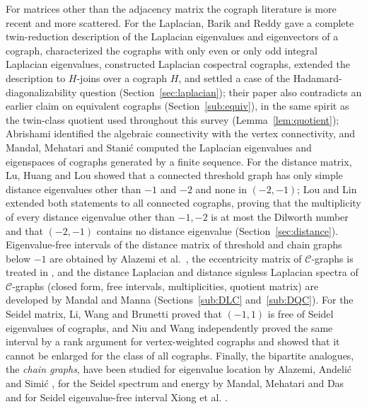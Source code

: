\documentclass[11pt]{article}
\theoremstyle{plain}
\theoremstyle{definition}
\theoremstyle{remark}
\begin{document}
	For matrices other than the adjacency matrix the cograph literature is more recent and more scattered. For the Laplacian, Barik and Reddy \cite{BarikReddy2023} gave a complete twin-reduction description of the Laplacian eigenvalues and eigenvectors of a cograph, characterized the cographs with only even or only odd integral Laplacian eigenvalues, constructed Laplacian cospectral cographs, extended the description to $H$-joins over a cograph $H$, and settled a case of the Hadamard-diagonalizability question (Section~\ref{sec:laplacian}); their paper also contradicts an earlier claim on equivalent cographs (Section~\ref{sub:equiv}), in the same spirit as the twin-class quotient used throughout this survey (Lemma~\ref{lem:quotient}); Abrishami \cite{Abrishami2019} identified the algebraic connectivity with the vertex connectivity, and Mandal, Mehatari and Stani\'c \cite{MandalMehatariStanic2024} computed the Laplacian eigenvalues and eigenspaces of cographs generated by a finite sequence. For the distance matrix, Lu, Huang and Lou \cite{LuHuangLou2018} showed that a connected threshold graph has only simple distance eigenvalues other than $-1$ and $-2$ and none in $(-2,-1)$; Lou and Lin \cite{LouLin2020} extended both statements to all connected cographs, proving that the multiplicity of every distance eigenvalue other than $-1,-2$ is at most the Dilworth number and that $(-2,-1)$ contains no distance eigenvalue (Section~\ref{sec:distance}). Eigenvalue-free intervals of the distance matrix of threshold and chain graphs below $-1$ are obtained by Alazemi et al.\ \cite{AlazemiEtAl2021cograph}, the eccentricity matrix of $\mathcal{C}$-graphs is treated in \cite{AshokanEccentricity2025}, and the distance Laplacian and distance signless Laplacian spectra of $\mathcal C$-graphs (closed form, free intervals, multiplicities, quotient matrix) are developed by Mandal and Manna \cite{MandalManna2026DLDQ} (Sections~\ref{sub:DLC} and~\ref{sub:DQC}). For the Seidel matrix, Li, Wang and Brunetti \cite{LiWangBrunetti2024} proved that $(-1,1)$ is free of Seidel eigenvalues of cographs, and Niu and Wang \cite{NiuWang2024} independently proved the same interval by a rank argument for vertex-weighted cographs and showed that it cannot be enlarged for the class of all cographs. Finally, the bipartite analogues, the \emph{chain graphs}, have been studied for eigenvalue location by Alazemi, Andeli\'c and Simi\'c \cite{AlazemiAndelicSimic2016}, for the Seidel spectrum and energy by Mandal, Mehatari and Das \cite{MandalMehataraDas2022} and for Seidel eigenvalue-free interval Xiong et al. \cite{XiongHou2024chain}.
	
\end{document}
